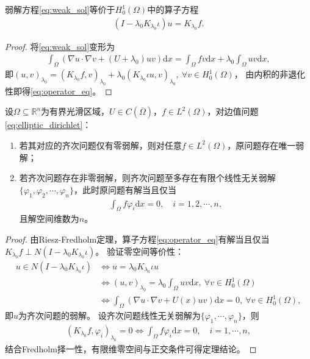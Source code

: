 \documentclass[../../main.tex]{subfiles}%
\begin{document}
\begin{proposition}
弱解方程\eqref{eq:weak_sol}等价于$H_0^1(\Omega)$中的算子方程
\begin{align}
\left(I-\lambda_0 K_{\lambda_0}\iota\right)u=K_{\lambda_0}f.
\label{eq:operator_eq}
\end{align}
\end{proposition}
\begin{proof}
将\eqref{eq:weak_sol}变形为
\begin{align*}
\int_{\Omega}\left(\nabla u\cdot\nabla v+\left(U+\lambda_0\right)uv\right)\mathrm{d}x=\int_{\Omega}fv\mathrm{d}x+\lambda_0\int_{\Omega}uv\mathrm{d}x,
\end{align*}
即$(u,v)_{\lambda_0}=(K_{\lambda_0}f,v)_{\lambda_0}+\lambda_0(K_{\lambda_0}\iota u,v)_{\lambda_0},\ \forall v\in H_0^1(\Omega)$，
由内积的非退化性即得\eqref{eq:operator_eq}。
\end{proof}

\begin{theorem}
设$\Omega\subseteq\mathbb{R}^n$为有界光滑区域，$U\in C(\overline{\Omega})$，$f\in L^2(\Omega)$，对边值问题\eqref{eq:elliptic_dirichlet}：
\begin{enumerate}[(1)]
\item 若其对应的齐次问题仅有零弱解，则对任意$f\in L^2(\Omega)$，原问题存在唯一弱解；
\item 若齐次问题存在非零弱解，则齐次问题至多存在有限个线性无关弱解$\{\varphi_1,\varphi_2,\cdots,\varphi_n\}$，此时原问题有解当且仅当
\begin{align*}
\int_{\Omega}f\varphi_i\mathrm{d}x=0,\quad i=1,2,\cdots,n,
\end{align*}
且解空间维数为$n$。
\end{enumerate}
\end{theorem}
\begin{proof}
由Riesz-Fredholm定理，算子方程\eqref{eq:operator_eq}有解当且仅当$K_{\lambda_0}f\perp N\left(I-\lambda_0 K_{\lambda_0}\iota\right)$。
验证零空间等价性：
\begin{align*}
u\in N\left(I-\lambda_0 K_{\lambda_0}\iota\right)&\iff u=\lambda_0 K_{\lambda_0}\iota u\\
&\iff (u,v)_{\lambda_0}=\lambda_0\int_{\Omega}uv\mathrm{d}x,\ \forall v\in H_0^1(\Omega)\\
&\iff \int_{\Omega}\left(\nabla u\cdot\nabla v+U(x)uv\right)\mathrm{d}x=0,\ \forall v\in H_0^1(\Omega),
\end{align*}
即$u$为齐次问题的弱解。
设齐次问题线性无关弱解为$\{\varphi_1,\cdots,\varphi_n\}$，则
\begin{align*}
(K_{\lambda_0}f,\varphi_i)_{\lambda_0}=0\iff\int_{\Omega}f\varphi_i\mathrm{d}x=0,\quad i=1,\cdots,n,
\end{align*}
结合Fredholm择一性，有限维零空间与正交条件可得定理结论。
\end{proof}
\end{document}
